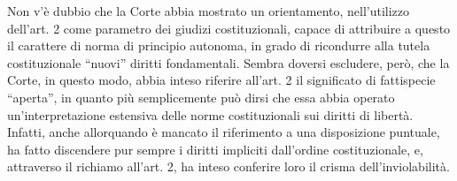 Non v’è dubbio che la Corte abbia mostrato un orientamento, nell’utilizzo dell’art. 2 come parametro dei giudizi costituzionali, capace di attribuire a questo il carattere di norma di principio autonoma, in grado di ricondurre alla tutela costituzionale “nuovi” diritti fondamentali. Sembra doversi escludere, però, che la Corte, in questo modo, abbia inteso riferire all’art. 2 il significato di fattispecie “aperta”, in quanto più semplicemente può dirsi che essa abbia operato un’interpretazione estensiva delle norme costituzionali sui diritti di libertà. Infatti, anche allorquando è mancato il riferimento a una disposizione puntuale, ha fatto discendere pur sempre i diritti impliciti dall’ordine costituzionale, e, attraverso il richiamo all’art. 2, ha inteso conferire loro il crisma dell’inviolabilità.


\begin{comment}Per diversi anni, a favore della fattispecie “chiusa” dell’art. 2 Cost. era stata anche la Corte costituzionale. 

\end{comment}
